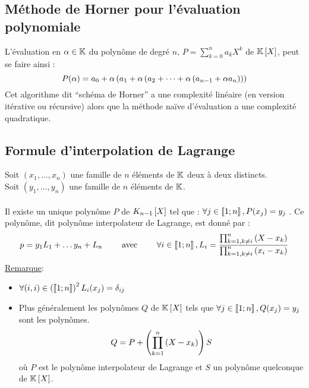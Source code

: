 \subsection{Méthode de Horner pour l’évaluation polynomiale}
\begin{defprop}
    L’évaluation en \(\alpha \in \mathbb{K}\) du polynôme de degré \(n\), \(P = \sum_{k = 0}^n a_k X^k\) de \(\mathbb{K} \left[X\right]\), peut se faire ainsi : 
    \[P(\alpha) = a_0 + \alpha \left(a_1 + \alpha\left(a_2 + \dots + \alpha \left( a_{n-1} + \alpha a_n\right)\right)\right)\]
    Cet algorithme dit “schéma de Horner” a une complexité linéaire (en version itérative ou récursive) alors que la méthode naïve d’évaluation a une complexité quadratique.
\end{defprop}
\subsection{Formule d’interpolation de Lagrange}
\begin{defprop}

    Soit \((x_1, \dots, x_n)\) une famille de \(n\) éléments de \(\mathbb{K}\) deux à deux distincts.\\
    Soit \((y_1, \dots, y_n)\) une famille de \(n\) éléments de \(\mathbb{K}\).\\~\\
    Il existe un unique polynôme \(P\) de \(K_{n-1}\left[X\right]\) tel que : \(\forall j \in \left\llbracket1;n\right\rrbracket , P (x_j ) = y_j\) . Ce polynôme, dit polynôme interpolateur de Lagrange, est donné par :
    \[p = y_1 L_1 + \dots y_n + L_n \qquad \text{ avec } \qquad \forall i \in \left\llbracket1;n\right\rrbracket, L_i = \frac{\prod_{k=1,k \neq i}^{n}\left(X - x_k\right)}{\prod_{k=1,k \neq i}^{n}\left(x_i - x_k\right)}\]
    \underline{Remarque}: \\
    \begin{itemize}
        \item \(\forall (i,i) \in \left(\left\llbracket1;n\right\rrbracket\right)^2 L_i(x_j) = \delta_{ij}\)
        \item Plus généralement les polynômes \(Q\) de \(\mathbb{K} \left[X\right]\) tels que \(\forall j \in \left\llbracket1;n\right\rrbracket, Q(x_j) =  y_j\) sont les polynômes.
        \[Q = P + \left(\prod_{k=1}^{n}\left(X-x_k\right)\right)S\]
        où \(P\) est le polynôme interpolateur de Lagrange et \(S\) un polynôme quelconque de \( \mathbb{K} \left[X\right]\).
    \end{itemize}
\end{defprop}
